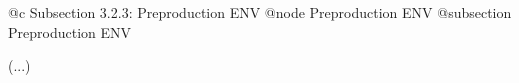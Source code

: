 @c Subsection 3.2.3: Preproduction ENV
@node Preproduction ENV
@subsection Preproduction ENV

(...)
